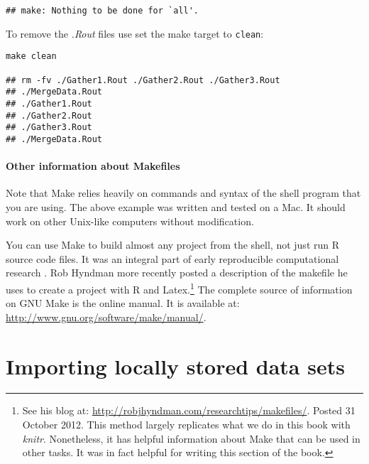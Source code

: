 \begin{knitrout}
	\color{fgcolor}
	\begin{kframe}
		\begin{verbatim}
## make: Nothing to be done for `all'.
			\end{verbatim}
		\end{kframe}
\end{knitrout}

\noindent To remove the \emph{.Rout} files use set the make target to \texttt{clean}:

\begin{knitrout}
	\color{fgcolor}
	\begin{kframe}
		\begin{verbatim}
make clean

## rm -fv ./Gather1.Rout ./Gather2.Rout ./Gather3.Rout 
## ./MergeData.Rout
## ./Gather1.Rout
## ./Gather2.Rout
## ./Gather3.Rout
## ./MergeData.Rout
			\end{verbatim}
		\end{kframe}
\end{knitrout}

\paragraph{Other information about Makefiles}

Note that Make relies heavily on commands and syntax of the shell program that you are using. The above example was written and tested on a Mac. It should work on other Unix-like computers without modification.

You can use Make to build almost any project from the shell, not just run R source code files. It was an integral part of early reproducible computational research \citep{Fomel2009, Buckheit1995}. Rob Hyndman more recently posted a description of the makefile he uses to create a project with R and Latex.\footnote{See his blog at: \url{http://robjhyndman.com/researchtips/makefiles/}. Posted 31 October 2012. This method largely replicates what we do in this book with \emph{knitr}. Nonetheless, it has helpful information about Make that can be used in other tasks. It was in fact helpful for writing this section of the book.} The complete source of information on GNU Make is the online manual. It is available at: \url{http://www.gnu.org/software/make/manual/}.

\section{Importing locally stored data sets}

